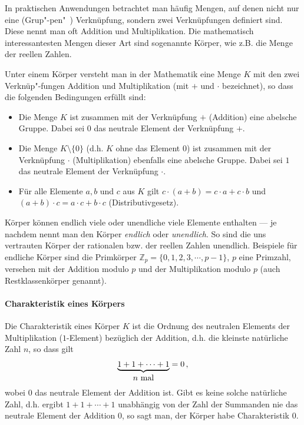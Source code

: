\begin{refsegment}
In praktischen Anwendungen betrachtet man häufig Mengen, auf denen nicht nur eine (Grup"-pen"~)
Verknüpfung, sondern zwei Verknüpfungen definiert sind. Diese nennt man oft Addition und Multiplikation. Die mathematisch interessantesten Mengen dieser Art sind sogenannte Körper, wie z.B. die Menge der reellen Zahlen.

Unter einem Körper versteht man in der Mathematik eine Menge $K$ mit den zwei Verknüp"-fungen Addition und Multiplikation (mit $+$ und $\cdot$ bezeichnet), so dass die folgenden Bedingungen erfüllt sind:
\begin{itemize}
   \item Die Menge $K$ ist zusammen mit der Verknüpfung $+$ (Addition)
         eine abelsche Gruppe. Dabei sei $0$ das neutrale Element der
	 Verknüpfung $+$.
   \item Die Menge $K\setminus\{0\}$ (d.h. $K$ ohne das Element 0) ist
         zusammen mit der Verknüpfung $\cdot$ (Multiplikation)
         ebenfalls eine abelsche Gruppe. Dabei sei $1$ das neutrale Element
	 der Verknüpfung $\cdot$.
   \item Für alle Elemente $a, b$ und $c$ aus $K$ gilt
         $c\cdot (a+b) = c \cdot a + c \cdot b$ und
         $(a+b) \cdot c = a \cdot c + b \cdot c$ (Distributivgesetz).
\end{itemize}

Körper können endlich viele oder unendliche viele Elemente enthalten --- je nachdem nennt man den Körper {\em endlich} oder {\em unendlich}. So sind die uns vertrauten Körper der rationalen bzw. der reellen Zahlen unendlich. Beispiele für endliche Körper sind die Primkörper
${\mathbb Z}_p = \{0, 1, 2, 3, \cdots, p-1\}$, $p$ eine Primzahl, versehen mit
der Addition modulo $p$ und der Multiplikation modulo $p$ (auch Restklassenkörper genannt).
\paragraph*{Charakteristik eines Körpers}
Die Charakteristik eines Körper $K$ ist die Ordnung des neutralen Elements der Multiplikation ($1$-Element) bezüglich der Addition, d.h. die kleinste natürliche Zahl $n$, so dass gilt
$$ \underbrace{1 + 1 + \cdots + 1}_{\hbox{$n$ mal}} =0
 \, ,
$$
wobei $0$ das neutrale Element der Addition ist.
Gibt es keine solche natürliche Zahl, d.h. ergibt $1 + 1 + \cdots + 1$ unabhängig von der Zahl der Summanden nie das neutrale Element der Addition $0$, so sagt man, der Körper habe Charakteristik $0$.


\end{refsegment}
